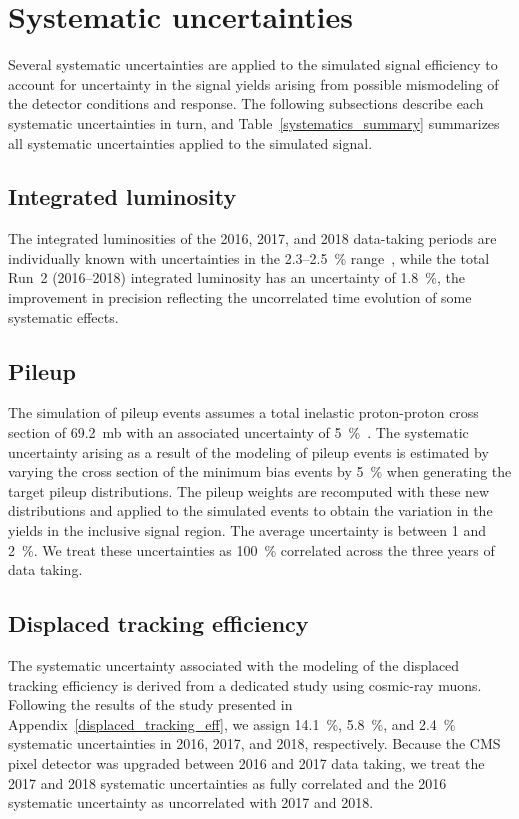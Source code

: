 \section{Systematic uncertainties}
\label{systematics}
Several systematic uncertainties are applied to the simulated signal efficiency to account for uncertainty in the signal yields arising from possible mismodeling of the detector conditions and response. The following subsections describe each systematic uncertainties in turn, and Table~\ref{systematics_summary} summarizes all systematic uncertainties applied to the simulated signal.



\subsection{Integrated luminosity}
The integrated luminosities of the 2016, 2017, and 2018 data-taking periods are individually known with uncertainties in the 2.3--\SI{2.5}{\percent} range~\cite{CMS:lumi2016,CMS:lumi2017,CMS:lumi2018}, while the total Run~2 (2016--2018) integrated luminosity has an uncertainty of \SI{1.8}{\percent}, the improvement in precision reflecting the uncorrelated time evolution of some systematic effects.

\subsection{Pileup}
The simulation of pileup events assumes a total inelastic proton-proton cross section of \SI{69.2}{\milli\barn} with an associated uncertainty of \SI{5}{\percent}~\cite{Sirunyan:2018nqx}. The systematic uncertainty arising as a result of the modeling of pileup events is estimated by varying the cross section of the minimum bias events by \SI{5}{\percent} when generating the target pileup distributions. The pileup weights are recomputed with these new distributions and applied to the simulated events to obtain the variation in the yields in the inclusive signal region. The average uncertainty is between 1 and \SI{2}{\percent}. We treat these uncertainties as \SI{100}{\percent} correlated across the three years of data taking.

\subsection{Displaced tracking efficiency}
The systematic uncertainty associated with the modeling of the displaced tracking efficiency is derived from a dedicated study using cosmic-ray muons. Following the results of the study presented in Appendix~\ref{displaced_tracking_eff}, we assign \SI{14.1}{\percent}, \SI{5.8}{\percent}, and \SI{2.4}{\percent} systematic uncertainties in 2016, 2017, and 2018, respectively. Because the CMS pixel detector was upgraded between 2016 and 2017 data taking, we treat the 2017 and 2018 systematic uncertainties as fully correlated and the 2016 systematic uncertainty as uncorrelated with 2017 and 2018.


